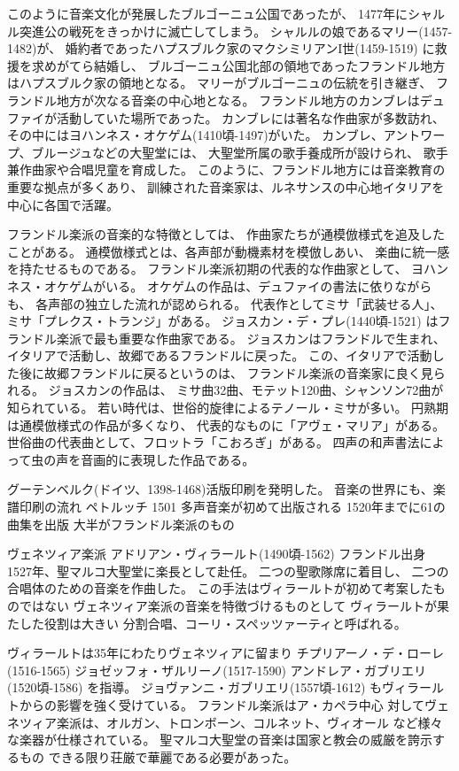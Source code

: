 \documentclass[a4j]{jarticle}
\begin{document}
このように音楽文化が発展したブルゴーニュ公国であったが、
1477年にシャルル突進公の戦死をきっかけに滅亡してしまう。
シャルルの娘であるマリー(1457-1482)が、
婚約者であったハプスブルク家のマクシミリアンI世(1459-1519)
に救援を求めがてら結婚し、
ブルゴーニュ公国北部の領地であったフランドル地方はハプスブルク家の領地となる。
マリーがブルゴーニュの伝統を引き継ぎ、
フランドル地方が次なる音楽の中心地となる。
フランドル地方のカンブレはデュファイが活動していた場所であった。
カンブレには著名な作曲家が多数訪れ、
その中にはヨハンネス・オケゲム(1410頃-1497)がいた。
カンブレ、アントワープ、ブルージュなどの大聖堂には、
大聖堂所属の歌手養成所が設けられ、
歌手兼作曲家や合唱児童を育成した。
このように、フランドル地方には音楽教育の重要な拠点が多くあり、
訓練された音楽家は、ルネサンスの中心地イタリアを中心に各国で活躍。

フランドル楽派の音楽的な特徴としては、
作曲家たちが通模倣様式を追及したことがある。
通模倣様式とは、各声部が動機素材を模倣しあい、
楽曲に統一感を持たせるものである。
フランドル楽派初期の代表的な作曲家として、
ヨハンネス・オケゲムがいる。
オケゲムの作品は、デュファイの書法に依りながらも、
各声部の独立した流れが認められる。
代表作としてミサ「武装せる人」、
ミサ「プレクス・トランジ」がある。
ジョスカン・デ・プレ(1440頃-1521)
はフランドル楽派で最も重要な作曲家である。
ジョスカンはフランドルで生まれ、
イタリアで活動し、故郷であるフランドルに戻った。
この、イタリアで活動した後に故郷フランドルに戻るというのは、
フランドル楽派の音楽家に良く見られる。
ジョスカンの作品は、
ミサ曲32曲、モテット120曲、シャンソン72曲が知られている。
若い時代は、世俗的旋律によるテノール・ミサが多い。
円熟期は通模倣様式の作品が多くなり、
代表的なものに「アヴェ・マリア」がある。
世俗曲の代表曲として、フロットラ「こおろぎ」がある。
四声の和声書法によって虫の声を音画的に表現した作品である。

グーテンベルク(ドイツ、1398-1468)活版印刷を発明した。
音楽の世界にも、楽譜印刷の流れ
ペトルッチ
1501 多声音楽が初めて出版される
1520年までに61の曲集を出版
大半がフランドル楽派のもの

ヴェネツィア楽派
アドリアン・ヴィラールト(1490頃-1562)
フランドル出身
1527年、聖マルコ大聖堂に楽長として赴任。
二つの聖歌隊席に着目し、
二つの合唱体のための音楽を作曲した。
この手法はヴィラールトが初めて考案したものではない
ヴェネツィア楽派の音楽を特徴づけるものとして
ヴィラールトが果たした役割は大きい
分割合唱、コーリ・スペッツァーティと呼ばれる。

ヴィラールトは35年にわたりヴェネツィアに留まり
チプリアーノ・デ・ローレ(1516-1565)
ジョゼッフォ・ザルリーノ(1517-1590)
アンドレア・ガブリエリ(1520頃-1586)
を指導。
ジョヴァンニ・ガブリエリ(1557頃-1612)
もヴィラールトからの影響を強く受けている。
フランドル楽派はア・カペラ中心
対してヴェネツィア楽派は、オルガン、トロンボーン、コルネット、ヴィオール
など様々な楽器が仕様されている。
聖マルコ大聖堂の音楽は国家と教会の威厳を誇示するもの
できる限り荘厳で華麗である必要があった。
\end{document}
